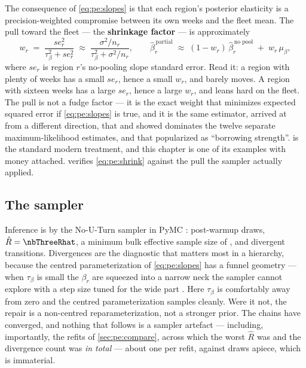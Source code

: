 The consequence of \cref{eq:pe:slopes} is that each region's posterior elasticity is a
precision-weighted compromise between its own weeks and the fleet mean. The pull toward the fleet
--- the \textbf{shrinkage factor} --- is approximately
%
\begin{equation}
  w_r \;=\; \frac{se_r^{2}}{\tau_\beta^{2} + se_r^{2}}
  \;\approx\; \frac{\sigma^{2}/n_r}{\tau_\beta^{2} + \sigma^{2}/n_r},
  \qquad
  \hat\beta_r^{\,\text{partial}} \;\approx\; (1 - w_r)\,\hat\beta_r^{\,\text{no pool}}
                                   \;+\; w_r\, \mu_\beta ,
  \label{eq:pe:shrink}
\end{equation}
%
where $se_r$ is region $r$'s no-pooling slope standard error. Read it: a region with plenty of
weeks has a small $se_r$, hence a small $w_r$, and barely moves. A region with sixteen weeks has a
large $se_r$, hence a large $w_r$, and leans hard on the fleet. The pull is not a fudge factor ---
it is the exact weight that minimizes expected squared error if \cref{eq:pe:slopes} is true, and it
is the same estimator, arrived at from a different direction, that \citet{stein1956} and
\citet{james1961} showed dominates the twelve separate maximum-likelihood estimates, and that
\citet{efron1977} popularized as ``borrowing strength''.  is the standard
modern treatment, and this chapter is one of its examples with money attached.
 verifies \cref{eq:pe:shrink} against the pull the sampler actually applied.

\subsection*{The sampler}

Inference is by the No-U-Turn sampler \citep{hoffman2014} in PyMC \citep{salvatier2016}:
\nbThreeNDraws{} post-warmup draws, $\hat R = \nbThreeRhat$, a minimum bulk effective sample size
of \nbThreeEss{} \citep{vehtari2021}, and \nbThreeDivergences{} divergent transitions. Divergences
are the diagnostic that matters most in a hierarchy, because the centred parameterization of
\cref{eq:pe:slopes} has a funnel geometry --- when $\tau_\beta$ is small the $\beta_r$ are squeezed
into a narrow neck the sampler cannot explore with a step size tuned for the wide part
\citep{betancourt2015}. Here $\tau_\beta$ is comfortably away from zero and the centred
parameterization samples cleanly. Were it not, the repair is a non-centred reparameterization, not
a stronger prior. The chains have converged, and nothing that follows is a sampler artefact ---
including, importantly, the \nbThreeNseed{} refits of \cref{sec:pe:compare}, across which the worst
$\hat R$ was \nbThreeRefitRhat{} and the divergence count was \nbThreeRefitDiv{} \emph{in total} ---
about one per refit, against \nbThreeNDraws{} draws apiece, which is immaterial.

